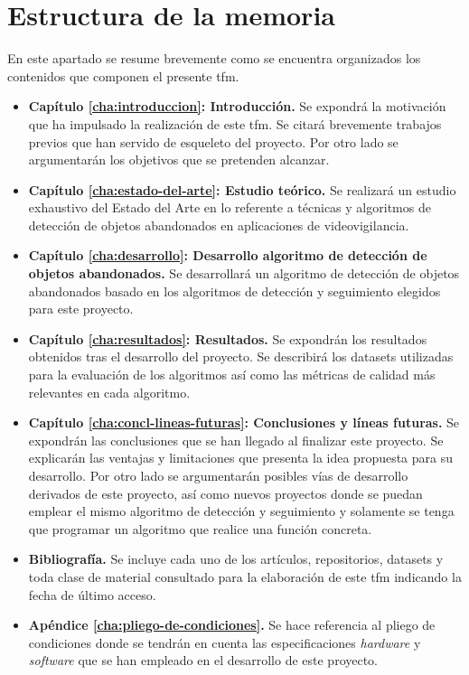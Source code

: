 \section{Estructura de la memoria}
\label{sec:estructura-memoria}
En este apartado se resume brevemente como se encuentra organizados los contenidos que componen el presente \gls{tfm}.

\begin{itemize}
    \item \textbf{Capítulo \ref{cha:introduccion}: Introducción.} Se expondrá la motivación que ha impulsado la realización de este \gls{tfm}. Se citará brevemente trabajos previos que han servido de esqueleto del proyecto. Por otro lado se argumentarán los objetivos que se pretenden alcanzar.
    \item \textbf{Capítulo \ref{cha:estado-del-arte}: Estudio teórico.} Se realizará un estudio exhaustivo del Estado del Arte en lo referente a técnicas y algoritmos de detección de objetos abandonados en aplicaciones de videovigilancia.
    \item \textbf{Capítulo \ref{cha:desarrollo}: Desarrollo algoritmo de detección de objetos abandonados.} Se desarrollará un algoritmo de detección de objetos abandonados basado en los algoritmos de detección y seguimiento elegidos para este proyecto.
    \item \textbf{Capítulo \ref{cha:resultados}: Resultados.} Se expondrán los resultados obtenidos tras el desarrollo del proyecto. Se describirá los datasets utilizadas para la evaluación de los algoritmos así como las métricas de calidad más relevantes en cada algoritmo.
    \item \textbf{Capítulo \ref{cha:concl-lineas-futuras}: Conclusiones y líneas futuras.} Se expondrán las conclusiones que se han llegado al finalizar este proyecto. Se explicarán las ventajas y limitaciones que presenta la idea propuesta para su desarrollo. Por otro lado se argumentarán posibles vías de desarrollo derivados de este proyecto, así como nuevos proyectos donde se puedan emplear el mismo algoritmo de detección y seguimiento y solamente se tenga que programar un algoritmo que realice una función concreta.
    \item \textbf{Bibliografía.} Se incluye cada uno de los artículos, repositorios, datasets y toda clase de material consultado para la elaboración de este \gls{tfm} indicando la fecha de último acceso. 
    \item \textbf{Apéndice \ref{cha:pliego-de-condiciones}.} Se hace referencia al pliego de condiciones donde se tendrán en cuenta las especificaciones \textit{hardware} y \textit{software} que se han empleado en el desarrollo de este proyecto.

\end{itemize}

